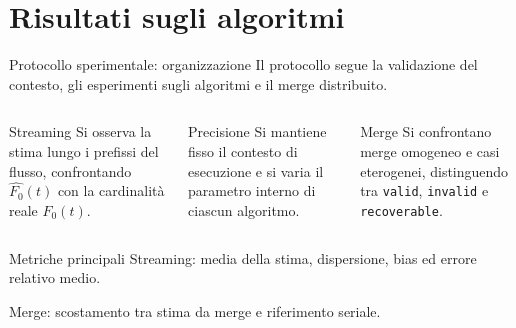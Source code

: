 \documentclass[aspectratio=169,11pt]{beamer}
\newcommand{\Fzero}{F_0}
\begin{document}
\section{Risultati sugli algoritmi}

\begin{frame}{Protocollo sperimentale: organizzazione}
    Il protocollo segue la validazione del contesto,
    gli esperimenti sugli algoritmi e il merge distribuito.

  \vspace{0.08cm}

  \begin{columns}[T,onlytextwidth]
      \begin{block}{Streaming}
        \scriptsize
        Si osserva la stima lungo i prefissi del flusso, confrontando
        \(\widehat{\Fzero}(t)\) con la cardinalit\`a reale \(\Fzero(t)\).
      \end{block}
      \begin{block}{Precisione}
        \scriptsize
        Si mantiene fisso il contesto di esecuzione e si varia il parametro
        interno di ciascun algoritmo.
      \end{block}
      \begin{block}{Merge}
        \scriptsize
        Si confrontano merge omogeneo e casi eterogenei, distinguendo tra
        \texttt{valid}, \texttt{invalid} e \texttt{recoverable}.
      \end{block}
  \end{columns}

  \vspace{0.08cm}

    \begin{alertblock}{Metriche principali}
    \scriptsize
    Streaming: media della stima, dispersione, bias ed errore relativo medio.

    Merge: scostamento tra stima da merge e riferimento seriale.
  \end{alertblock}
\end{frame}
\end{document}
